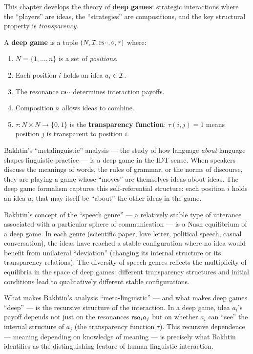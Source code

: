 This chapter develops the theory of \textbf{deep games}: strategic
interactions where the ``players'' are ideas, the ``strategies'' are
compositions, and the key structural property is \emph{transparency}.

\begin{definition}
\label{def:deep-game}
A \textbf{deep game} is a tuple $(N, \mathcal{I}, \mathrm{rs}{\cdot}{\cdot}, \circ,
\tau)$ where:
\begin{enumerate}
\item $N = \{1, \ldots, n\}$ is a set of \emph{positions}.
\item Each position $i$ holds an idea $a_i \in \mathcal{I}$.
\item The resonance $\mathrm{rs}{\cdot}{\cdot}$ determines interaction payoffs.
\item Composition $\circ$ allows ideas to combine.
\item $\tau\colon N \times N \to \{0, 1\}$ is the \textbf{transparency
  function}: $\tau(i, j) = 1$ means position $j$ is transparent to position
  $i$.
\end{enumerate}
\end{definition}

\begin{interpretation}
\label{interp:ch20:bakhtin_metalinguistics}
Bakhtin's ``metalinguistic'' analysis --- the study of how language
\emph{about} language shapes linguistic practice --- is a deep game in the
IDT sense.  When speakers discuss the meanings of words, the rules of
grammar, or the norms of discourse, they are playing a game whose
``moves'' are themselves ideas about ideas.  The deep game formalism
captures this self-referential structure: each position $i$ holds an idea
$a_i$ that may itself be ``about'' the other ideas in the game.

Bakhtin's concept of the ``speech genre'' --- a relatively stable type of
utterance associated with a particular sphere of communication --- is a
Nash equilibrium of a deep game.  In each genre (scientific paper,
love letter, political speech, casual conversation), the ideas have
reached a stable configuration where no idea would benefit from unilateral
``deviation'' (changing its internal structure or its transparency relations).
The diversity of speech genres reflects the multiplicity of equilibria in
the space of deep games: different transparency structures and initial
conditions lead to qualitatively different stable configurations.

What makes Bakhtin's analysis ``meta-linguistic'' --- and what makes deep
games ``deep'' --- is the recursive structure of the interaction.  In a
deep game, idea $a_i$'s payoff depends not just on the resonances
$\mathrm{rs}{a_i}{a_j}$ but on whether $a_i$ can ``see'' the internal structure
of $a_j$ (the transparency function $\tau$).  This recursive dependence
--- meaning depending on knowledge of meaning --- is precisely what Bakhtin
identifies as the distinguishing feature of human linguistic interaction.
\end{interpretation}

